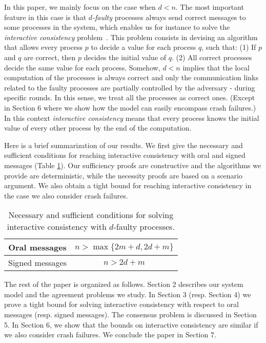 \documentclass[11pt,letterpaper]{article}
\newcommand{\tmem}[1]{{\em #1\/}}
\begin{document}
In this paper, we mainly focus on the case when $d<n$.
The most important feature in this case is that {\tmem{$d$-faulty}}
processes always send correct messages to some processes in the system,
which enables us for instance to solve the \tmem{interactive consistency} problem~\cite{fischer1983consensus}. This problem consists in devising an algorithm
that allows every process $p$ to decide a value for each process $q$,
such that: (1) If $p$ and $q$ are correct, then $p$ decides the
initial value of $q$. (2) All correct processes decide the same
value for each process. Somehow, $d<n$ implies that the local
computation of the processes is always correct and only the
communication links related to the faulty processes are partially
controlled by the adversary - during specific rounds.
In this sense,  we treat all the processes as
correct ones. (Except in Section 6 where we show how the model 
can easily encompass crash failures.) 
In this context {\tmem{interactive consistency}}
means that every process knows the initial value of every other
process by the end of the computation.

Here is a brief summarization of our results.
We first give the necessary and sufficient
conditions for reaching interactive consistency with oral and signed
messages (Table \ref{tab:results}). Our sufficiency proofs are constructive and the algorithms
we provide are deterministic, while the necessity proofs are based on a 
scenario argument. We also obtain a tight bound for reaching interactive
consistency in the case we also consider crash failures.


\begin{table}[h]
\centering
\begin{tabular}{|c|c|}
\hline
Oral messages & $n> \max \{ 2m+d,2d+m \}$\\
\hline
Signed messages & $n>2d+m$\\
\hline
\end{tabular}
\caption{\label{tab:results}Necessary and sufficient conditions for solving
interactive consistency with $d$-faulty processes.}
\end{table}

The rest of the paper is organized as follows. Section 2 describes our system model and the agreement problems we study. In Section 3 (resp. Section 4) we prove a  tight bound for solving interactive consistency  with respect to oral messages (resp. signed messages). The consensus problem is discussed in Section 5. 
In Section 6, we show that the bounds on interactive consistency are similar if we also consider crash failures. 
We conclude the paper  in Section 7.













\newpage




\newpage
\appendix


\end{document}
